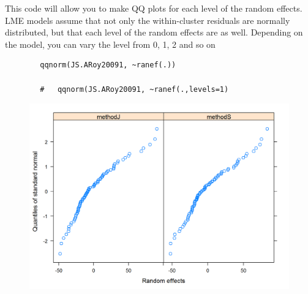 \documentclass[12pt, a4paper]{report}
\theoremstyle{plain}
\theoremstyle{definition}
\theoremstyle{remark}
\begin{document}
	This code will allow you to make QQ plots for each level of the random effects.  LME models assume that not only the within-cluster residuals are normally distributed, but that each level of the random effects are as well. Depending on the model, you can vary the level from 0, 1, 2 and so on
	\begin{framed}
		\begin{verbatim}
		qqnorm(JS.ARoy20091, ~ranef(.))
		
		# 	qqnorm(JS.ARoy20091, ~ranef(.,levels=1)
		\end{verbatim}
	\end{framed}
	\begin{figure}[h!]
		\centering
		\includegraphics[width=0.9\linewidth]{images/ResidPlot2}
		\caption{}
		\label{fig:ResidPlot2}
	\end{figure}	
	
	
\end{document}
